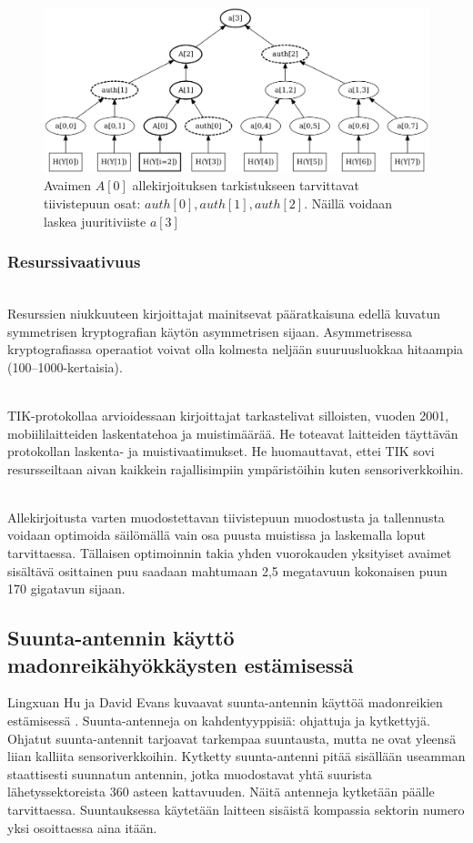 \documentclass[finnish]{tktltiki2}
\theoremstyle{definition}
\theoremstyle{remark}
\begin{document}
\begin{figure}[h]
  \centering
  \includegraphics[width=\linewidth]{2000px-MerkleTree2}
  \caption{Avaimen $A[0]$ allekirjoituksen tarkistukseen tarvittavat tiivistepuun osat: $auth[0], auth[1], auth[2]$. Näillä voidaan laskea juuritiviiste $a[3]$ \cite{wikipedia-merkle}}
  \label{fig:merkle-tree}
\end{figure}

\subsubsection{Resurssivaativuus} 
\noindent \\
Resurssien niukkuuteen kirjoittajat mainitsevat pääratkaisuna edellä kuvatun symmetrisen kryptografian käytön asymmetrisen sijaan. Asymmetrisessa kryptografiassa operaatiot voivat olla kolmesta neljään suuruusluokkaa hitaampia (100--1000-kertaisia).

\noindent \\
TIK-protokollaa arvioidessaan kirjoittajat tarkastelivat silloisten, vuoden 2001, mobiililaitteiden laskentatehoa ja muistimäärää. He toteavat laitteiden täyttävän protokollan laskenta- ja muistivaatimukset. He huomauttavat, ettei TIK sovi resursseiltaan aivan kaikkein rajallisimpiin ympäristöihin kuten sensoriverkkoihin.

\noindent \\
Allekirjoitusta varten muodostettavan tiivistepuun muodostusta ja tallennusta voidaan optimoida säilömällä vain osa puusta muistissa ja laskemalla loput tarvittaessa. Tällaisen optimoinnin takia yhden vuorokauden yksityiset avaimet sisältävä osittainen puu saadaan mahtumaan 2,5 megatavuun kokonaisen puun 170 gigatavun sijaan.

% 
% 
% 
% 
% 
% 
\subsection{Suunta-antennin käyttö madonreikähyökkäysten estämisessä}
% 
% 
% 
% 
% 
% 
% 
% 
% 
% 
Lingxuan Hu ja David Evans kuvaavat suunta-antennin käyttöä madonreikien estämisessä \cite{antenna}. Suunta-antenneja on kahdentyyppisiä: ohjattuja ja kytkettyjä. Ohjatut suunta-antennit tarjoavat tarkempaa suuntausta, mutta ne ovat yleensä liian kalliita sensoriverkkoihin. Kytketty suunta-antenni pitää sisällään useamman staattisesti suunnatun antennin, jotka muodostavat yhtä suurista lähetyssektoreista 360 asteen kattavuuden. Näitä antenneja kytketään päälle tarvittaessa. Suuntauksessa käytetään laitteen sisäistä kompassia sektorin numero yksi osoittaessa aina itään.
\end{document}
